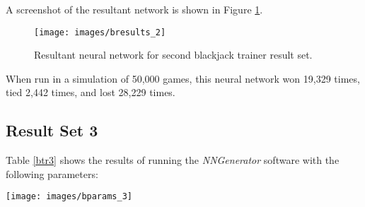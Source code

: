 A screenshot of the resultant network is shown in Figure \ref{bresults_2}.

\begin{figure}[h!]
  \centering
  \texttt{[image: images/bresults\_2]}
  \caption{Resultant neural network for second blackjack trainer result set.}
  \label{bresults_2}
\end{figure}

When run in a simulation of 50,000 games, this neural network won 19,329
times, tied 2,442 times, and lost 28,229 times.

\subsection{Result Set 3}
Table \ref{btr3} shows the results of running the {\it NNGenerator} software with the following parameters:

\begin{center}
\texttt{[image: images/bparams\_3]}
\end{center}

